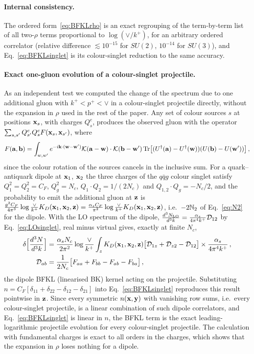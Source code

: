 \paragraph{Internal consistency.} The ordered form~\eqref{eq:BFKLrho} is an exact regrouping of the term-by-term list of all two-$\rho$ terms proportional to $\log(\vee/k^+)$, for an arbitrary ordered correlator (relative difference $\lesssim10^{-15}$ for $SU(2)$, $10^{-14}$ for $SU(3)$), and Eq.~\eqref{eq:BFKLsinglet} is its colour-singlet reduction to the same accuracy.

\paragraph{Exact one-gluon evolution of a colour-singlet projectile.} As an independent test we computed the change of the spectrum due to one additional gluon with $k^+<p^+<\vee$ in a colour-singlet projectile directly, without the expansion in $\rho$ used in the rest of the paper. Any set of colour sources $s$ at positions $\mathbf{x}_s$, with charges $Q_s^e$, produces the observed gluon with the operator $\sum_{s,s'}Q^e_{s'}Q^e_sF(\mathbf{x}_s,\mathbf{x}_{s'})$, where
\begin{align}
F(\mathbf{a},\mathbf{b})=\int_{w,w'}e^{-i\mathbf{k}\cdot(\mathbf{w}-\mathbf{w}')}\mathcal{K}(\mathbf{a}-\mathbf{w})\cdot\mathcal{K}(\mathbf{b}-\mathbf{w}')\,{\rm Tr}\big[(U^\dagger(\mathbf{a})-U^\dagger(\mathbf{w}))(U(\mathbf{b})-U(\mathbf{w}'))\big]\,,
\end{align}
since the colour rotation of the sources cancels in the inclusive sum. For a quark--antiquark dipole at $\mathbf{x}_1$, $\mathbf{x}_2$ the three charges of the $q\bar qg$ colour singlet satisfy $Q_1^2=Q_2^2=C_F$, $Q_g^2=N_c$, $Q_1\cdot Q_2=1/(2N_c)$ and $Q_{1,2}\cdot Q_g=-N_c/2$, and the probability to emit the additional gluon at $\mathbf{z}$ is $\frac{g^2C_F}{4\pi^3}\log\frac{\vee}{k^+}K_D(\mathbf{x}_1,\mathbf{x}_2,\mathbf{z})=\frac{\alpha_sC_F}{\pi^2}\log\frac{\vee}{k^+}K_D(\mathbf{x}_1,\mathbf{x}_2,\mathbf{z})$, i.e.\ $-2\mathbb{N}_2$ of Eq.~\eqref{eq:N2} for the dipole. With the LO spectrum of the dipole, $\frac{d^3N_{\rm LO}}{d^3k}=\frac{\alpha_s}{4\pi^4k^+}\mathcal D_{12}$ by Eq.~\eqref{eq:LOsinglet}, real minus virtual gives, exactly at finite $N_c$,
\begin{align}
\delta\Big[\frac{d^3N}{d^3k}\Big]&=\frac{\alpha_sN_c}{2\pi^2}\log\frac{\vee}{k^+}\int_zK_D(\mathbf{x}_1,\mathbf{x}_2,\mathbf{z})\big[\mathcal D_{1z}+\mathcal D_{z2}-\mathcal D_{12}\big]\times\frac{\alpha_s}{4\pi^4k^+}\,,\notag\\
\mathcal D_{ab}&=\frac{1}{2N_c}\big[F_{aa}+F_{bb}-F_{ab}-F_{ba}\big]\,,
\end{align}
the dipole BFKL (linearised BK) kernel acting on the projectile. Substituting $n=C_F[\delta_{11}+\delta_{22}-\delta_{12}-\delta_{21}]$ into Eq.~\eqref{eq:BFKLsinglet} reproduces this result pointwise in $\mathbf{z}$. Since every symmetric $n(\mathbf{x},\mathbf{y})$ with vanishing row sums, i.e.\ every colour-singlet projectile, is a linear combination of such dipole correlators, and Eq.~\eqref{eq:BFKLsinglet} is linear in $n$, the BFKL term is the exact leading-logarithmic projectile evolution for every colour-singlet projectile. The calculation with fundamental charges is exact to all orders in the charges, which shows that the expansion in $\rho$ loses nothing for a dipole.

